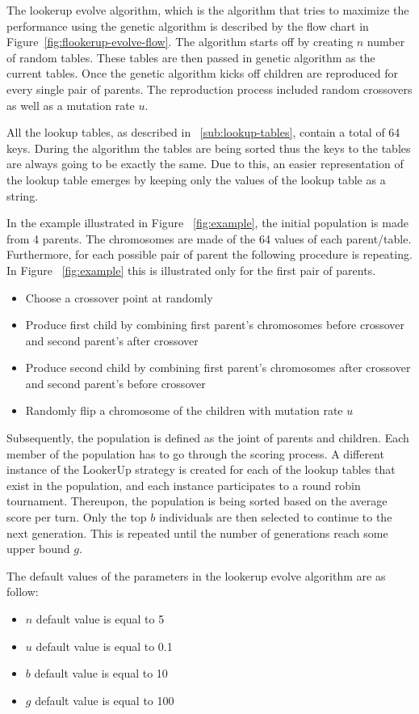The lookerup evolve algorithm, which is the algorithm that tries to maximize
the performance using the genetic algorithm is described by the flow chart in
Figure~\ref{fig:flookerup-evolve-flow}. The algorithm starts off by creating
\(n\) number of random tables. These tables are then passed in genetic algorithm
as the current tables.
Once the genetic algorithm kicks off children are reproduced for every single pair
of parents. The reproduction process included random crossovers as well as a
mutation rate \(u\).

All the lookup tables, as described in ~\autoref{sub:lookup-tables}, contain
a total of 64 keys. During the algorithm the tables are being sorted thus
the keys to the tables are always going to be exactly the same. Due to this,
an easier representation of the lookup table emerges by keeping only the values
of the lookup table as a string.

In the example illustrated in Figure ~\ref{fig:example}, the initial population
is made from 4 parents. The chromosomes are made of the 64 values of each parent/table.
Furthermore, for each possible pair of parent the following procedure is repeating.
In Figure ~\ref{fig:example} this is illustrated only for the first pair of
parents.
\begin{itemize}
  \item Choose a crossover point at randomly
  \item Produce first child by combining first parent's chromosomes before crossover and second parent's
        after crossover
  \item Produce second child by combining first parent's chromosomes after crossover and second parent's
        before crossover
  \item Randomly flip a chromosome of the children with mutation rate \(u\)
\end{itemize}

\newpage
Subsequently, the population is defined as the joint of parents and children.
Each member of the population has to go through the scoring process. A different
instance of the LookerUp strategy is created for each of the lookup tables that
exist in the population, and each instance participates to a round robin tournament.
Thereupon, the population is being sorted based on the average score per turn.
Only the top \(b\) individuals are then selected to continue to the next generation.
This is repeated until the number of generations reach some upper bound \(g\).

The default values of the parameters in the lookerup evolve algorithm are as
follow:
\begin{itemize}
  \item \(n\) default value is equal to 5
  \item \(u\) default value is equal to 0.1
  \item \(b\) default value is equal to 10
  \item \(g\) default value is equal to 100
\end{itemize}

